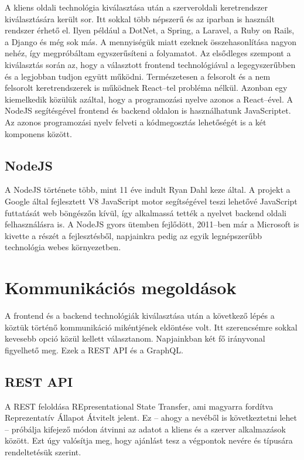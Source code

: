 A kliens oldali technológia kiválasztása után a szerveroldali keretrendszer kiválasztására került sor.
Itt sokkal több népszerű és az iparban is használt rendszer érhető el. Ilyen például a DotNet, a Spring, a Laravel, a Ruby on Rails, a Django és még sok más. A mennyiségük miatt ezeknek összehasonlítása nagyon nehéz, így megpróbáltam egyszerűsíteni a folyamatot. Az elsődleges szempont a kiválasztás során az, hogy a választott frontend technológiával a legegyszerűbben és a legjobban tudjon együtt működni. Természetesen a felsorolt és a nem felsorolt keretrendszerek is működnek React–tel probléma nélkül. Azonban egy kiemelkedik közülük azáltal, hogy a programozási nyelve azonos a React–ével. A NodeJS segítésgével frontend és backend oldalon is használhatunk JavaScriptet. Az azonos programozási nyelv felveti a kódmegosztás lehetőségét is a két komponens között. 

\subsection{NodeJS}
A NodeJS története több, mint 11 éve indult Ryan Dahl keze által. A projekt a Google által fejlesztett V8 JavaScript motor segítségével teszi lehetővé JavaScript futtatását web böngészőn kívül, így alkalmassá tették a nyelvet backend oldali felhasználásra is. A NodeJS gyors ütemben fejlődött, 2011–ben már a Microsoft is kivette a részét a fejlesztésből, napjainkra pedig az egyik legnépszerűbb technológia webes környezetben.\cite{NodeJS}

\section{Kommunikációs megoldások}

A frontend és a backend technológiák kiválasztása után a következő lépés a köztük történő kommunikáció mikéntjének eldöntése volt.
Itt szerencsémre sokkal kevesebb opció közül kellett választanom. Napjainkban két fő irányvonal figyelhető meg. Ezek a REST API és a GraphQL.

\subsection{REST API}
A REST feloldása REpresentational State Transfer, ami magyarra fordítva Reprezentatív Állapot Átvitelt jelent. Ez – ahogy a nevéből is következtetni lehet – próbálja kifejező módon átvinni az adatot a kliens és a szerver alkalmazások között.
Ezt úgy valósítja meg, hogy ajánlást tesz a végpontok nevére és típusára rendeltetésük szerint.

